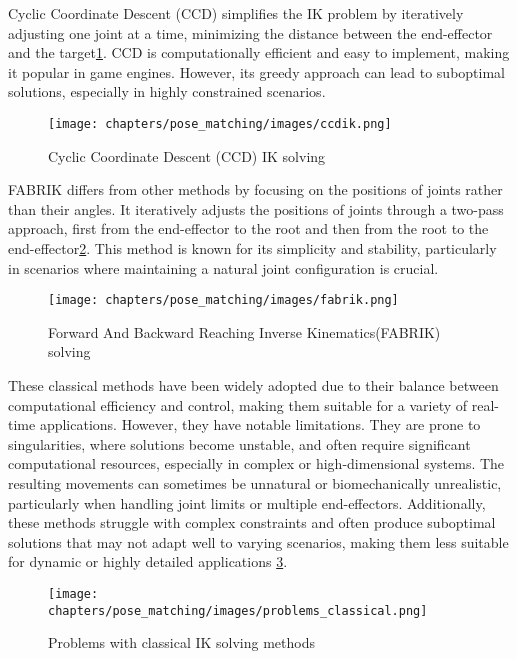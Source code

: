 \documentclass[../../main.tex]{subfiles}
\begin{document}
Cyclic Coordinate Descent (CCD) simplifies the IK problem by iteratively adjusting one joint at a time, minimizing the distance between the end-effector and the target\ref{fig:ccdik}. CCD is computationally efficient and easy to implement, making it popular in game engines. However, its greedy approach can lead to suboptimal solutions, especially in highly constrained scenarios\cite{TODO}.

\begin{figure}
  \centering \texttt{[image: chapters/pose\_matching/images/ccdik.png]}
  \caption{Cyclic Coordinate Descent (CCD) IK solving}
  \label{fig:ccdik}
\end{figure}

FABRIK differs from other methods by focusing on the positions of joints rather than their angles. It iteratively adjusts the positions of joints through a two-pass approach, first from the end-effector to the root and then from the root to the end-effector\ref{fig:fabrik}. This method is known for its simplicity and stability, particularly in scenarios where maintaining a natural joint configuration is crucial\cite{TODO}.

\begin{figure}
  \centering \texttt{[image: chapters/pose\_matching/images/fabrik.png]}
  \caption{Forward And Backward Reaching Inverse Kinematics(FABRIK) solving}
  \label{fig:fabrik}
\end{figure}

These classical methods have been widely adopted due to their balance between computational efficiency and control, making them suitable for a variety of real-time applications. However, they have notable limitations. They are prone to singularities, where solutions become unstable, and often require significant computational resources, especially in complex or high-dimensional systems. The resulting movements can sometimes be unnatural or biomechanically unrealistic, particularly when handling joint limits or multiple end-effectors. Additionally, these methods struggle with complex constraints and often produce suboptimal solutions that may not adapt well to varying scenarios, making them less suitable for dynamic or highly detailed applications \ref{fig:problems_classical}.

\begin{figure}
  \centering \texttt{[image: chapters/pose\_matching/images/problems\_classical.png]}
  \caption{Problems with classical IK solving methods}
  \label{fig:problems_classical}
\end{figure}
\end{document}

